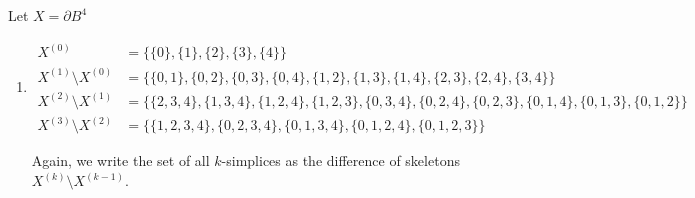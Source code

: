 \documentclass[12 pt, letterpaper]{hmcpset}
\begin{document}
\begin{solution}
	Let $X = \partial B^{4}$
	\begin{enumerate}
		\item
			\[
				\boxed{
					\begin{split}
						X^{(0)} & = \{ \{ 0 \}, \{ 1 \}, \{ 2 \}, \{ 3 \}, \{ 4 \} \} \\
						X^{(1)} \setminus X^{(0)} & = \{ \{ 0, 1 \}, \{ 0, 2 \}, \{ 0, 3 \}, \{ 0, 4 \}, \{ 1, 2 \}, \{ 1, 3 \}, \{ 1, 4 \}, \{ 2, 3 \}, \{ 2, 4 \}, \{ 3, 4 \} \} \\
						X^{(2)} \setminus X^{(1)} & = \{ \{ 2, 3, 4 \}, \{ 1, 3, 4 \}, \{ 1, 2, 4 \}, \{ 1, 2, 3 \}, \{ 0, 3, 4 \}, \{ 0, 2, 4 \}, \{ 0, 2, 3 \}, \{ 0, 1, 4 \}, \{ 0, 1, 3 \}, \{ 0, 1, 2 \} \} \\
						X^{(3)} \setminus X^{(2)} & = \{ \{ 1, 2, 3, 4 \}, \{ 0, 2, 3, 4 \}, \{ 0, 1, 3, 4 \}, \{ 0, 1, 2, 4 \}, \{ 0, 1, 2, 3 \} \}
					\end{split}
				}
			\]

			Again, we write the set of all $k$-simplices as the difference of skeletons $X^{(k)} \setminus X^{(k - 1)}$.


\end{enumerate}
\end{solution}
\end{document}
